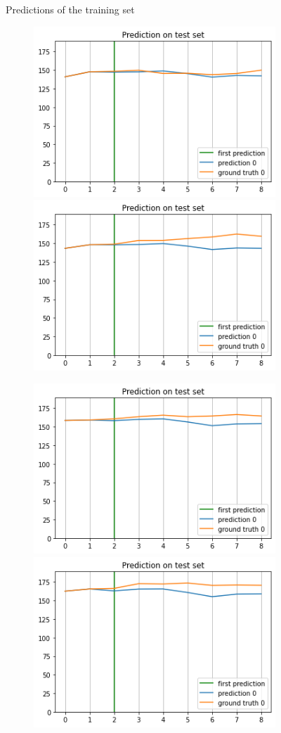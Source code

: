 \documentclass[a4paper]{article}
\begin{document}
\begin{figure}
\begin{subfigure}{\linewidth}
\begin{center}
      \end{center}
    \end{subfigure}\par\medskip
    \caption{Predictions of the training set}
    \label{fig:rnn3_train}  
  \end{figure}

  \begin{figure}
    \begin{subfigure}{\linewidth}
      \includegraphics[width=.45\linewidth]{rnn3_test_1.png}\hfill
      \includegraphics[width=.45\linewidth]{rnn3_test_2.png}\hfill
    \end{subfigure}\par\medskip
    \begin{subfigure}{\linewidth}
      \includegraphics[width=.45\linewidth]{rnn3_test_3.png}\hfill
      \includegraphics[width=.45\linewidth]{rnn3_test_4.png}\hfill

\end{subfigure}
\end{figure}
\end{document}

